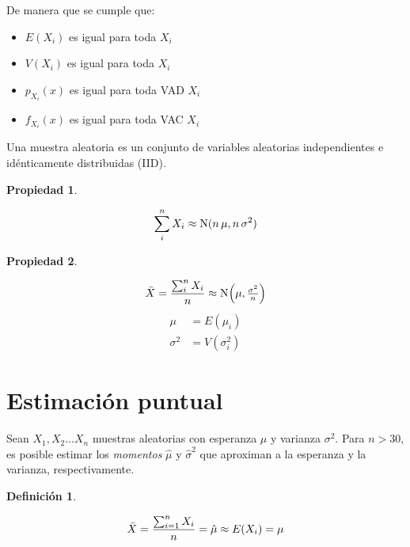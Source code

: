 \documentclass[a5paper,12pt,twoside]{book}
\newtheorem{defn}{{Definición}}[chapter]
\newtheorem{prop}{{Propiedad}}[chapter]
\begin{document}
De manera que se cumple que:
\begin{itemize}
    \item $E(X_i)$ es igual para toda $X_i$
    \item $V(X_i)$ es igual para toda $X_i$
    \item $p_{X_i}(x)$ es igual para toda VAD $X_i$
    \item $f_{X_i}(x)$ es igual para toda VAC $X_i$
\end{itemize}

Una muestra aleatoria es un conjunto de variables aleatorias independientes e idénticamente distribuidas (IID).

\begin{mdframed}[style=PropertyFrame]
    \begin{prop}
    \end{prop}
    \begin{equation*}
        \sum_i^n X_i \approx \nor(n \, \mu , n \, \sigma^2)
    \end{equation*}
\end{mdframed}

\begin{mdframed}[style=PropertyFrame]
    \begin{prop}
    \end{prop}
    \begin{equation*}
        \ave{X} = \dfrac{\sum_i^n X_i}{n} \approx \fx[\nor]{\mu, \tfrac{\sigma^2}{n}}
    \end{equation*}
    \begin{align*}
        \mu &= E(\mu_i) 
        \\
        \sigma^2 &= V(\sigma_i^2)
    \end{align*}
\end{mdframed}


\section{Estimación puntual}

Sean $X_1,X_2 \dots X_n$ muestras aleatorias con esperanza $\mu$ y varianza $\sigma^2$.
Para $n>30$, es posible estimar los \emph{momentos} $\hat{\mu}$ y $\hat{\sigma}^2$ que aproximan a la esperanza y la varianza, respectivamente.

\begin{mdframed}[style=DefinitionFrame]
    \begin{defn}
    \end{defn}
    \begin{equation*}
        \ave{X} = \frac{\sum_{i=1}^n X_i}{n} = \hat{\mu} \approx E(X_i) = \mu
    \end{equation*}
\end{mdframed}
\end{document}
